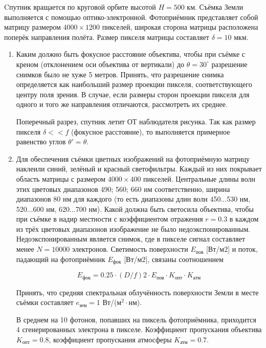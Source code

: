 
Cпутник вращается по круговой орбите высотой $H=500$ км. Съёмка Земли выполняется с помощью оптико-электронной. 
Фотоприёмник представляет собой матрицу размером $4000 \times 1200$ пикселей, широкая сторона матрицы 
расположена поперёк направления полёта. Размер пикселя матрицы составляет $\delta=10$ мкм.

\begin{enumerate}
\item Каким должно быть фокусное расстояние объектива, чтобы при съёмке с креном (отклонением оси 
объектива от вертикали) до $\theta=30^{\circ}$ разрешение снимков было не хуже 5 метров. Принять, 
что разрешение снимка определяется как наибольший размер проекции пикселя, соответствующего центру поля зрения. 
В случае, если размеры сторон проекции пикселя для одного и того же направления отличаются, рассмотреть их среднее.


Поперечный разрез, спутник летит ОТ наблюдателя рисунка. Так как размер пикселя 
$\delta << f$ (фокусное расстояние), то выполняется примерное равенство углов $\theta' = \theta$.

\item Для обеспечения съёмки цветных изображений на фотоприёмную матрицу наклеили синий, зелёный и 
красный светофильтры. Каждый из них покрывает область матрицы с размером $4000 \times 400$ пикселей. Центральные 
длины волн этих цветовых диапазонов 490; 560; 660 нм соответственно, ширина диапазонов 80 нм для каждого 
(то есть диапазоны длин волн 450...530 нм, 520...600 нм, 620...700 нм). Какой должна быть светосила объектива, 
чтобы при съёмке в надир местности с коэффициентом отражения $r = 0.3$ в каждом из трёх цветовых диапазонов 
изображение не было недоэкспонированным. Недоэкспонированным является снимок, где в пикселе сигнал 
составляет менее $N = 10000$ электронов. Светимость поверхности $E_{\text{пов}}$ [Вт/м2] и поток, падающий на 
фотоприёмник $E_{\text{фок}}$ [Вт/м2], связаны соотношением 

$$E_{\text{фок}}=0.25 \cdot (D/f)2 \cdot E_{\text{пов}} \cdot K_{\text{опт}} \cdot K_{\text{атм}}$$

Принять, что средняя спектральная облучённость поверхности Земли в месте съёмки составляет $e_{\text{зем}} = 1$ Вт/(м$^2 \cdot $нм).

В среднем на 10 фотонов, попавших на пиксель фотоприёмника, приходится 4 сгенерированных электрона в 
пикселе. Коэффициент пропускания объектива $K_{\text{опт}} = 0.8$, коэффициент пропускания атмосферы $K_{\text{атм}} = 0.7$.


\end{enumerate}
